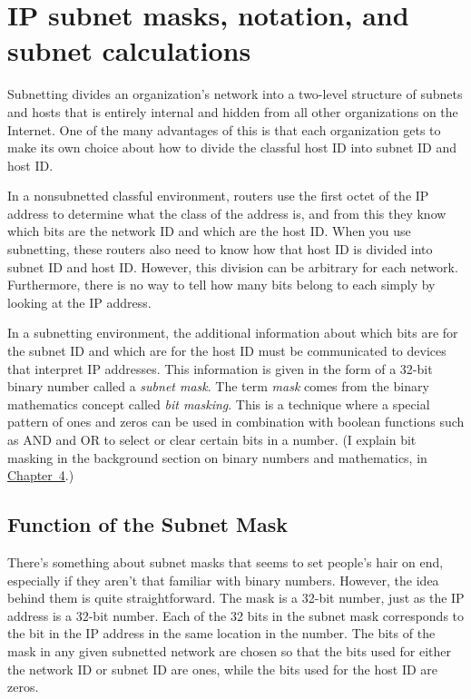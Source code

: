 \section{IP subnet masks, notation, and subnet calculations}

Subnetting divides an organization's network into a two-level structure of subnets
and hosts that is entirely internal and hidden from all other
organizations on the Internet. One of the many advantages of this is
that each organization gets to make its own choice about how to divide
the classful host ID into subnet ID and host ID.

In a nonsubnetted classful environment, routers use the first octet of
the IP address to determine what the class of the address is, and from
this they know which bits are the network ID and which are the host ID.
When you use subnetting, these routers also need to know how that host
ID is divided into subnet ID and host ID. However, this division can be
arbitrary for each network. Furthermore, there is no way to tell how
many bits belong to each simply by looking at the IP address.

In a subnetting environment, the additional information about which bits
are for the subnet ID and which are for the host ID must be communicated
to devices that interpret IP addresses. This information is given in the
form of a 32-bit binary number called a {\emph{subnet mask}}. The term
{\emph{mask}} comes from the binary mathematics concept called
\protect\hypertarget{ch18s03.htmlux5cux23idx-CHP-18-0721}{}{}{\emph{bit
masking}}. This is a technique where a special pattern of ones and zeros
can be used in combination with boolean functions such as AND and OR to
select or clear certain bits in a number. (I explain bit masking in the
background section on binary numbers and mathematics, in
\protect\hyperlink{ch04.html}{Chapter~4}.)

\subsection{Function of the Subnet Mask}

There's something about subnet
\protect\hypertarget{ch18s03.htmlux5cux23idx-CHP-18-0722}{}{}masks that
seems to set people's hair on end, especially if they aren't that
familiar with binary numbers. However, the idea behind them is quite
straightforward. The mask is a 32-bit number, just as the IP address is
a 32-bit number. Each of the 32 bits in the
\protect\hypertarget{ch18s03.htmlux5cux23idx-CHP-18-0723}{}{}subnet mask
corresponds to the bit in the IP address in the same location in the
number. The bits of the mask in any given subnetted network are chosen
so that the bits used for either the network ID or subnet ID are ones,
while the bits used for the host ID are zeros.


